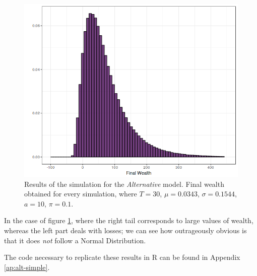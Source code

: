 \begin{figure}[H]
    \centering
    \includegraphics[scale=0.65]{./images/fw_alt.png}
    \caption{Results of the simulation for the \textit{Alternative} model. Final wealth obtained for every simulation, where $T=30$, $\mu = 0.0343$, $\sigma = 0.1544$, $a=10$, $\pi = 0.1$.}
    \label{fig:alt_fw}
\end{figure}

In the case of figure \ref{fig:alt_fw}, where the right tail corresponds to large values of wealth, whereas the left part deals with losses; we can see how outrageously obvious is that it does \textit{not} follow a Normal Distribution.

The code necessary to replicate these results in R can be found in Appendix \ref{ap:alt-simple}.

